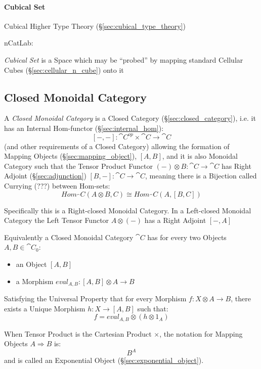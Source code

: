 \paragraph{Cubical Set}\label{sec:cubical_set}\hfill

Cubical Higher Type Theory (\S\ref{sec:cubical_type_theory})

nCatLab:

\emph{Cubical Set} is a Space which may be ``probed'' by mapping
standard Cellular Cubes (\S\ref{sec:cellular_n_cube}) onto it



\subsection{Closed Monoidal Category}\label{sec:closed_monoidal}

A \emph{Closed Monoidal Category} is a Closed Category
(\S\ref{sec:closed_category}), i.e. it has an Internal Hom-functor
(\S\ref{sec:internal_hom}):
\[
  [-,-] : \cat{C}^{op} \times \cat{C} \rightarrow \cat{C}
\]
(and other requirements of a Closed Category) allowing the formation
of Mapping Objects (\S\ref{sec:mapping_object}), $[A,B]$,
and it is also Monoidal Category such that the Tensor Product Functor
$(-) \otimes B : \cat{C} \rightarrow \cat{C}$ has Right Adjoint
(\S\ref{sec:adjunction}) $[B,-] : \cat{C} \rightarrow \cat{C}$,
meaning there is a Bijection called Currying (???) between Hom-sets:
\[
  Hom_\cat{C}(A \otimes B,C) \cong Hom_\cat{C}(A, [B,C])
\]

Specifically this is a Right-closed Monoidal Category. In a
Left-closed Monoidal Category the Left Tensor Functor $A \otimes (-)$
has a Right Adjoint $[-,A]$

Equivalently a Closed Monoidal Category $\cat{C}$ has for every two
Objects $A,B \in \cat{C}_0$:
\begin{itemize}
  \item an Object $[A,B]$
  \item a Morphism $eval_{A,B} : [A,B] \otimes A \rightarrow B$
\end{itemize}
Satisfying the Universal Property that for every Morphism $f : X
\otimes A \rightarrow B$, there exists a Unique Morphism $h : X
\rightarrow [A,B]$ such that:
\[
  f = eval_{A,B} \otimes (h \otimes 1_A)
\]

When Tensor Product is the Cartesian Product $\times$, the notation
for Mapping Objects $A \Rightarrow B$ is:
\[
  B^A
\]
and is called an Exponential Object (\S\ref{sec:exponential_object}).

